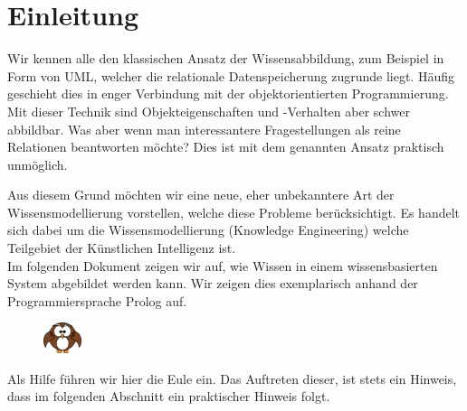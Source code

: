 \chapter{Einleitung}
\label{chap:einleitung}
Wir kennen alle den klassischen Ansatz der Wissensabbildung, zum Beispiel in Form von UML, welcher die relationale Datenspeicherung zugrunde liegt. Häufig geschieht dies in enger Verbindung mit der objektorientierten Programmierung. Mit dieser Technik sind Objekteigenschaften und -Verhalten aber schwer abbildbar. Was aber wenn man interessantere Fragestellungen als reine Relationen beantworten möchte? Dies ist mit dem genannten Ansatz praktisch unmöglich.  

Aus diesem Grund möchten wir eine neue, eher unbekanntere Art der Wissensmodellierung vorstellen, welche diese Probleme berücksichtigt. Es handelt sich dabei um die Wissensmodellierung (Knowledge Engineering) welche Teilgebiet der Künstlichen Intelligenz ist. \\
Im folgenden Dokument zeigen wir auf, wie Wissen in einem wissensbasierten System abgebildet werden kann. Wir zeigen dies exemplarisch anhand der Programmiersprache Prolog auf.

\vspace{10pt}
\begin{figure}
    \vspace{-19pt}
    \includegraphics[width=0.1\textwidth]{bilder/owl.png}
\end{figure}
Als Hilfe führen wir hier die Eule ein. Das Auftreten dieser, ist stets ein Hinweis, dass im folgenden Abschnitt ein praktischer Hinweis folgt.
